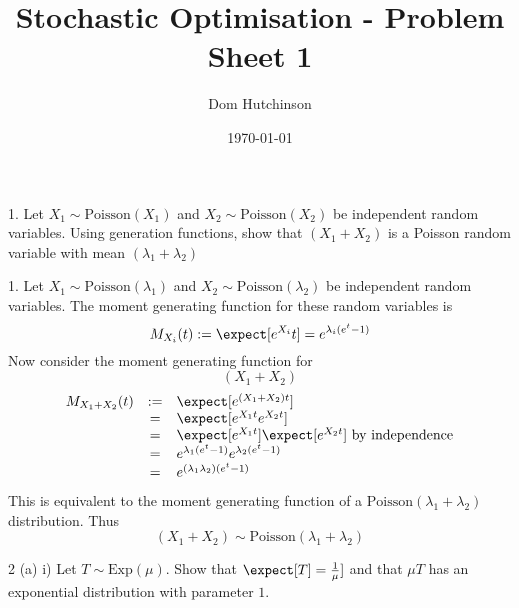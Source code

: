 \documentclass[11pt,a4paper]{article}
\begin{document}

\title{Stochastic Optimisation - Problem Sheet 1}
\author{Dom Hutchinson}
\date{\today}
\maketitle

\begin{question}{1.}
  Let $X_1\sim\text{Poisson}(X_1)$ and $X_2\sim\text{Poisson}(X_2)$ be independent random variables. Using generation functions, show that $(X_1+X_2)$ is a Poisson random variable with mean $(\lambda_1+\lambda_2)$
\end{question}

\begin{answer}{1.}
  Let $X_1\sim\text{Poisson}(\lambda_1)$ and $X_2\sim\text{Poisson}(\lambda_2)$ be independent random variables. The moment generating function for these random variables is
  \[ M_{X_i}(t):=\expect[e^{X_i}t]=e^{\lambda_i(e^t-1)} \]
  Now consider the moment generating function for \[ (X_1+X_2) \]
  \[\begin{array}{rcl}
    M_{X_1+X_2}(t)&:=&\expect[e^{(X_1+X_2)t}]\\
    &=&\expect[e^{X_1t}e^{X_2t}]\\
    &=&\expect[e^{X_1t}]\expect[e^{X_2t}]\text{ by independence}\\
    &=&e^{\lambda_1(e^t-1)}e^{\lambda_2(e^t-1)}\\
    &=&e^{(\lambda_1\lambda_2)(e^t-1)}
  \end{array}\]
  This is equivalent to the moment generating function of a $\text{Poisson}(\lambda_1+\lambda_2)$ distribution. Thus
  \[ (X_1+X_2)\sim\text{Poisson}(\lambda_1+\lambda_2) \]
\end{answer}

\begin{question}{2 (a) i)}
  Let $T\sim\text{Exp}(\mu)$. Show that $\expect[T]=\frac1\mu]$ and that $\mu T$ has an exponential distribution with parameter $1$.
\end{question}
\end{document}
